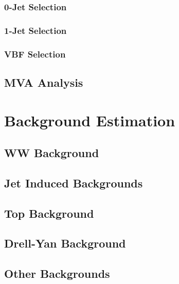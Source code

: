 \documentclass{cmspaper}
\begin{document}
    \subsubsection{0-Jet Selection}
      \label{sec:sel_zerojet}
      
    \subsubsection{1-Jet Selection}
      \label{sec:sel_onejet}
      
    \subsubsection{VBF Selection}
      \label{sec:sel_vbf}
      
  \subsection{MVA Analysis}
    \label{sec:anal_mva}
    
%    

\clearpage
\section{Background Estimation}
    \label{sec:backgrounds}
    
    \label{sec:bkg_intro}
  \subsection{WW Background}
    \label{sec:bkg_ww}
    
  \subsection{Jet Induced Backgrounds}
    \label{sec:bkg_fakes}
    
  \subsection{Top Background}
    \label{sec:bkg_top}
    
  \subsection{Drell-Yan Background}
    \label{sec:bkg_dy}
    
  \subsection{Other Backgrounds}
    \label{sec:bkg_other}
    
\end{document}
